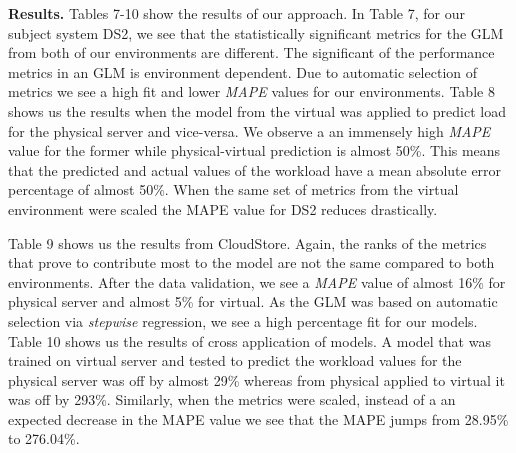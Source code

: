 	
	


 
\textbf{Results.} Tables 7-10 show the results of our approach. In Table 7, for our subject system DS2, we see that the statistically significant metrics for the GLM from both of our environments are different. The significant of the performance metrics in an GLM is environment dependent. Due to automatic selection of metrics we see a high fit and lower \textit{MAPE} values for our environments. Table 8 shows us the results when the model from the virtual was applied to predict load for the physical server and vice-versa. We observe a an immensely high \textit{MAPE} value for the former while physical-virtual prediction is almost 50\%. This means that the predicted and actual values of the workload have a mean absolute error percentage of almost 50\%. When the same set of metrics from the virtual environment were scaled the MAPE value for DS2 reduces drastically.


Table 9 shows us the results from CloudStore. Again, the ranks of the metrics that prove to contribute most to the model are not the same compared to both environments. After the data validation, we see a \textit{MAPE} value of almost 16\% for physical server and almost 5\% for virtual. As the GLM was based on automatic selection via \textit{stepwise} regression, we see a high percentage fit for our models. 
Table 10 shows us the results of cross application of models. A model that was trained on virtual server and tested to predict the workload values for the physical server was off by almost 29\% whereas from physical applied to virtual it was off by 293\%. Similarly, when the metrics were scaled, instead of a an expected decrease in the MAPE value we see that the MAPE jumps from 28.95\% to 276.04\%.

